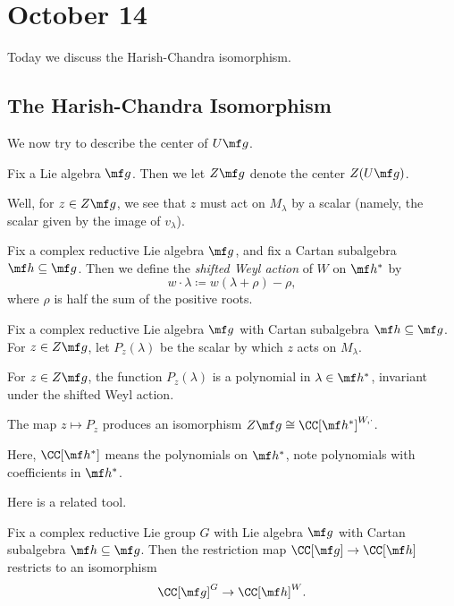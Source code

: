 \documentclass[../notes.tex]{subfiles}
\begin{document}
\section{October 14}
Today we discuss the Harish-Chandra isomorphism.

\subsection{The Harish-Chandra Isomorphism}
We now try to describe the center of $U\mf g$.
\begin{notation}
	Fix a Lie algebra $\mf g$. Then we let $Z\mf g$ denote the center $Z(U\mf g)$.
\end{notation}
Well, for $z\in Z\mf g$, we see that $z$ must act on $M_\lambda$ by a scalar (namely, the scalar given by the image of $v_\lambda$).
\begin{definition}
	Fix a complex reductive Lie algebra $\mf g$, and fix a Cartan subalgebra $\mf h\subseteq\mf g$. Then we define the \textit{shifted Weyl action} of $W$ on $\mf h^*$ by
	\[w\cdot\lambda\coloneqq w(\lambda+\rho)-\rho,\]
	where $\rho$ is half the sum of the positive roots.
\end{definition}
\begin{theorem} \label{thm:hc-iso}
	Fix a complex reductive Lie algebra $\mf g$ with Cartan subalgebra $\mf h\subseteq\mf g$. For $z\in Z\mf g$, let $P_z(\lambda)$ be the scalar by which $z$ acts on $M_\lambda$.
	\begin{listalph}
		\item For $z\in Z\mf g$, the function $P_z(\lambda)$ is a polynomial in $\lambda\in\mf h^*$, invariant under the shifted Weyl action.
		\item The map $z\mapsto P_z$ produces an isomorphism $Z\mf g\cong\CC[\mf h^*]^{W,\cdot}$.
	\end{listalph}
\end{theorem}
\begin{remark}
	Here, $\CC[\mf h^*]$ means the polynomials on $\mf h^*$, note polynomials with coefficients in $\mf h^*$.
\end{remark}
Here is a related tool.
\begin{theorem} \label{thm:chev-res}
	Fix a complex reductive Lie group $G$ with Lie algebra $\mf g$ with Cartan subalgebra $\mf h\subseteq\mf g$. Then the restriction map $\CC[\mf g]\to\CC[\mf h]$ restricts to an isomorphism
	\[\CC[\mf g]^G\to\CC[\mf h]^W.\]
\end{theorem}
\end{document}
